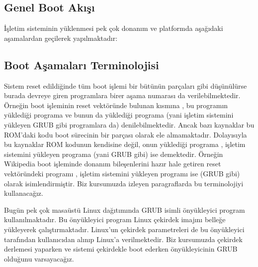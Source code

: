 \documentclass[a4paper,10pt,turkish]{sphinxmanual}
\begin{document}
\subsection{Genel Boot Akışı}
\label{\detokenize{introduction:genel-boot-akisi}}
\sphinxAtStartPar
İşletim sisteminin yüklenmesi pek çok donanım ve platformda aşağıdaki aşamalardan geçilerek yapılmaktadır:



\subsection{Boot Aşamaları Terminolojisi}
\label{\detokenize{introduction:boot-asamalari-terminolojisi}}
\sphinxAtStartPar
Sistem reset edildiğinde tüm boot işlemi bir bütünün parçaları gibi düşünülürse burada devreye giren programlara
birer aşama numarası da verilebilmektedir. Örneğin boot işleminin reset vektöründe bulunan kısmına , bu programın yüklediği programa  ve bunun da yüklediği programa (yani işletim sistemini yükleyen GRUB gibi
programlara da)  denilebilmektedir. Ancak bazı
kaynaklar bu ROM’daki kodu boot sürecinin bir parçası olarak ele almamaktadır. Dolayısıyla bu kaynaklar ROM
kodunun kendisine değil, onun yüklediği programa ,
işletim sistemini yükleyen programa (yani GRUB gibi) ise  demektedir. Örneğin Wikipedia boot işleminde donanım bileşenlerini hazır hale getiren reset
vektöründeki programı , işletim sistemini yükleyen programı ise (GRUB gibi)  olarak isimlendirmiştir. Biz kursumuzda izleyen paragraflarda bu terminolojiyi kullanacağız.

\sphinxAtStartPar
Bugün pek çok masaüstü Linux dağıtımında GRUB isimli önyükleyici program kullanılmaktadır. Bu önyükleyici program
Linux çekirdek imajını belleğe yükleyerek çalıştırmaktadır. Linux’un çekirdek parametreleri de bu önyükleyici
tarafından kullanıcıdan alınıp Linux’a verilmektedir. Biz kursumuzda çekirdek derlemesi yaparken ve sistemi
çekirdekle boot ederken önyükleyicinin GRUB olduğunu varsayacağız.
\end{document}
